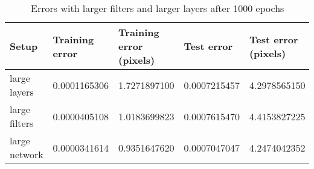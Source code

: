 \begin{table}[h!]
\centering
\footnotesize
\begin{tabular}{|l|l|l|l|l|}
	\hline
		\textbf{Setup} & \textbf{Training error} & \textbf{Training error (pixels)} & \textbf{Test error} & \textbf{Test error (pixels)}\\
	\hline
		large layers	& 0.0001165306%
						& 1.7271897100%
						& 0.0007215457%
						& 4.2978565150%
						\\
	\hline
		large filters	& 0.0000405108%
						& 1.0183699823%
						& 0.0007615470%
						& 4.4153827225%
						\\
	\hline
		large network	& 0.0000341614%
						& 0.9351647620%
						& 0.0007047047%
						& 4.2474042352%
						\\
	\hline
	\end{tabular}
	\normalsize
	\caption{Errors with larger filters and larger layers after 1000 epochs}
	\label{tab:cnn_errors_largenet}
\end{table}
